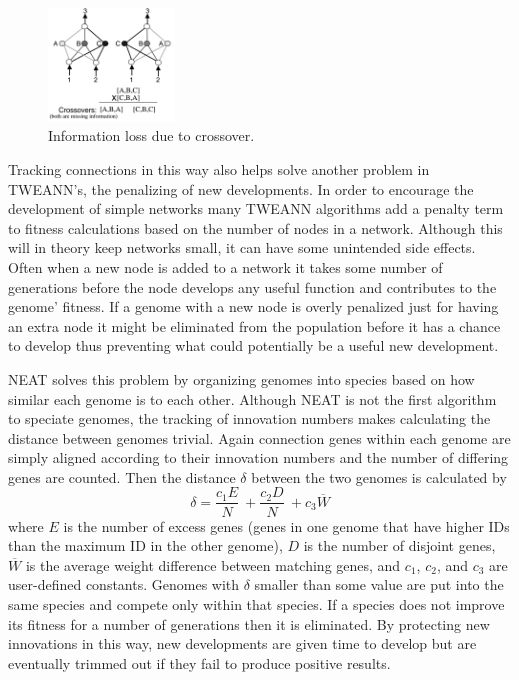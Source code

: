 \documentclass[twocolumn,letterpaper]{article}
\begin{document}
\begin{figure}[h]
	\centering
	\includegraphics[width=0.3\textwidth]{images/crossover.png}
	\caption{Information loss due to crossover.}
	\label{fig:crossover_loss}
\end{figure} 

Tracking connections in this way also helps solve another problem in TWEANN's, the penalizing of new
developments. In order to encourage the development of simple networks many TWEANN algorithms add a penalty
term to fitness calculations based on the number of nodes in a network. Although this will in theory keep
networks small, it can have some unintended side effects. Often when a new node is added to a network
it takes some number of generations before the node develops any useful function and contributes to the 
genome' fitness. If a genome with a new node is overly penalized just for having an extra node it might be
eliminated from the population before it has a chance to develop thus preventing what could potentially be a
useful new development.

NEAT solves this problem by organizing genomes into species based on how similar each genome is to each other.
Although NEAT is not the first algorithm to speciate genomes, the tracking of innovation numbers makes
calculating the distance between genomes trivial. Again connection genes within each genome are simply
aligned according to their innovation numbers and the number of differing genes are counted. Then the distance
$\delta$ between the two genomes is calculated by
\begin{equation}
\delta = \frac{c_1E}{N}\ + \frac{c_2D}{N}\ + c_3\overline{W}
\end{equation}
where $E$ is the number of excess genes (genes in one genome that have higher IDs than the maximum
ID in the other genome), $D$ is the number of disjoint genes, $\overline{W}$ is the average weight
difference between matching genes, and $c_1$, $c_2$, and $c_3$ are user-defined constants. Genomes with 
$\delta$ smaller than some value are put into the same species and compete only within that species. If a
species does not improve its fitness for a number of generations then it is eliminated. By protecting new
innovations in this way, new developments are given time to develop but are eventually trimmed out if they 
fail to produce positive results.
\end{document}
